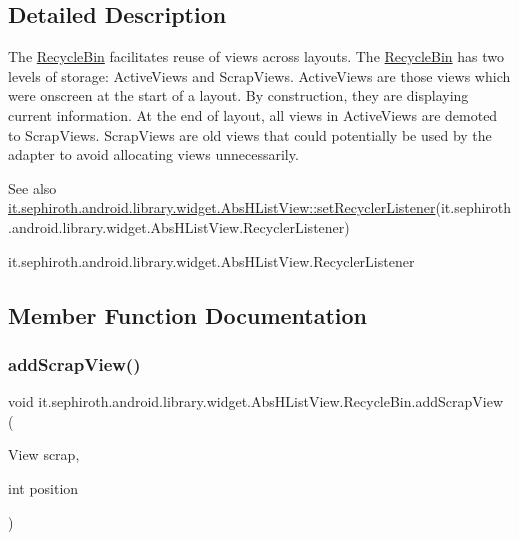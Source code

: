 \subsection{Detailed Description}
The \hyperlink{classit_1_1sephiroth_1_1android_1_1library_1_1widget_1_1_abs_h_list_view_1_1_recycle_bin}{Recycle\+Bin} facilitates reuse of views across layouts. The \hyperlink{classit_1_1sephiroth_1_1android_1_1library_1_1widget_1_1_abs_h_list_view_1_1_recycle_bin}{Recycle\+Bin} has two levels of storage\+: Active\+Views and Scrap\+Views. Active\+Views are those views which were onscreen at the start of a layout. By construction, they are displaying current information. At the end of layout, all views in Active\+Views are demoted to Scrap\+Views. Scrap\+Views are old views that could potentially be used by the adapter to avoid allocating views unnecessarily.

\begin{DoxySeeAlso}{See also}
\hyperlink{classit_1_1sephiroth_1_1android_1_1library_1_1widget_1_1_abs_h_list_view_a3eadd4738e3c529aafefa4f6bb1f5b94}{it.\+sephiroth.\+android.\+library.\+widget.\+Abs\+H\+List\+View\+::set\+Recycler\+Listener}(it.\+sephiroth.\+android.\+library.\+widget.\+Abs\+H\+List\+View.\+Recycler\+Listener) 

it.\+sephiroth.\+android.\+library.\+widget.\+Abs\+H\+List\+View.\+Recycler\+Listener 
\end{DoxySeeAlso}


\subsection{Member Function Documentation}
\mbox{\label{classit_1_1sephiroth_1_1android_1_1library_1_1widget_1_1_abs_h_list_view_1_1_recycle_bin_a2d534ed45386e876172e9c6982e3ed2d}} 
\subsubsection{\texorpdfstring{add\+Scrap\+View()}{addScrapView()}}
{\footnotesize\ttfamily void it.\+sephiroth.\+android.\+library.\+widget.\+Abs\+H\+List\+View.\+Recycle\+Bin.\+add\+Scrap\+View (\begin{DoxyParamCaption}\item[{View}]{scrap,  }\item[{int}]{position }\end{DoxyParamCaption})}


